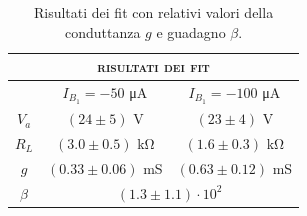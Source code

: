 \begin{table}[htb]
    \centering
    \begin{tabular}{||c||c||c||}
    \hline \hline
    \multicolumn{3}{||c||}{\textsc{risultati dei fit}}\\
    \hline \hline
      & $I_{B_1} = -50$ \si{\micro\ampere} & $I_{B_1} = -100$ \si{\micro\ampere}\\
    \hline \hline
    $V_a$ & $(24 \pm 5)$ \si{V} & $(23 \pm 4)$ \si{V}\\
    $R_L$ & $(3.0 \pm 0.5)$ \si{\kilo\ohm} & $(1.6\pm 0.3)$ \si{\kilo\ohm} \\
    $g$ & $(0.33 \pm 0.06)$ \si{mS} & $(0.63 \pm 0.12)$ \si{mS} \\
    \hline
    $\beta$ & \multicolumn{2}{c||}{$(1.3 \pm 1.1) \cdot 10^{2}$} \\
    \hline\hline
    \end{tabular}
    \caption{Risultati dei fit con relativi valori della conduttanza $g$ e guadagno $\beta$.}
    \label{tab:fit_res}
\end{table}